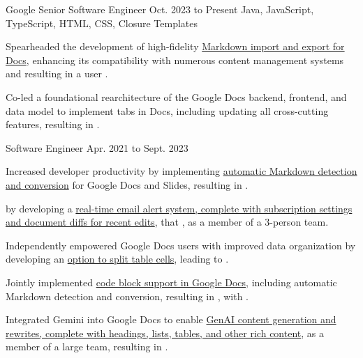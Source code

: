 
\begin{cventry}
    {Google}
    {Senior Software Engineer}
    {Oct. 2023 to Present}
    {Java, JavaScript, TypeScript, HTML, CSS, Closure Templates}
    \begin{cvitems}
        \item Spearheaded the development of high-fidelity \href{https://workspaceupdates.googleblog.com/2024/07/import-and-export-markdown-in-google-docs.html}{Markdown import and export for Docs}, enhancing its compatibility with numerous content management systems and resulting in a user . 
        \item Co-led a foundational rearchitecture of the Google Docs backend, frontend, and data model to implement tabs in Docs, including updating all cross-cutting features, resulting in .
    \end{cvitems}
\end{cventry}

\begin{cventry}
    {}
    {Software Engineer}
    {Apr. 2021 to Sept. 2023}{}
    \begin{cvitems}
        \item Increased developer productivity by implementing \href{https://workspaceupdates.googleblog.com/2022/03/compose-with-markdown-in-google-docs-on.html}{automatic Markdown detection and conversion} for Google Docs and Slides, resulting in .
        \item {} by developing a \href{https://workspaceupdates.googleblog.com/2022/07/edit-notifications-for-document-content-changes.html}{real-time email alert system, complete with subscription settings and document diffs for recent edits}, that , as a member of a 3-person team.
        \item Independently empowered Google Docs users with improved data organization by developing an \href{https://workspaceupdates.googleblog.com/2022/10/split-table-cells-in-google-docs.html}{option to split table cells}, leading to .
        \item Jointly implemented \href{https://workspaceupdates.googleblog.com/2022/12/format-display-code-google-docs.html}{code block support in Google Docs}, including automatic Markdown detection and conversion, resulting in , with .
        \item Integrated Gemini into Google Docs to enable \href{https://workspace.google.com/blog/product-announcements/generative-ai}{GenAI content generation and rewrites, complete with headings, lists, tables, and other rich content}, as a member of a large team, resulting in .
    \end{cvitems}
\end{cventry}


